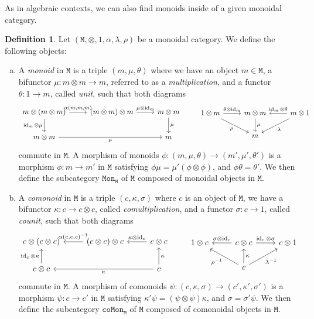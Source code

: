\documentclass[11pt, reqno]{amsart}
\theoremstyle{definition}
\newtheorem{definition}[theorem]{Definition}
\newcommand{\cat}{\texttt}
\newcommand{\catfont}{\texttt}
\newcommand{\Mon}{{\catfont{Mon}}}          %
\newcommand{\coMon}{{\catfont{coMon}}}      %
\DeclareMathOperator{\Id}{id}     %
\begin{document}
As in algebraic contexts, we can also find monoids inside of a given monoidal
category.

\begin{definition}
\label{def:(co)monoids}
Let \((\cat M, \otimes, 1, \alpha, \lambda, \rho)\) be a monoidal category. We
define the following objects:
\begin{enumerate}[(a)]\setlength\itemsep{0em}
\item A \emph{monoid} in \(\cat M\) is a triple \((m, \mu, \theta)\) where we
  have an object \(m \in \cat M\), a bifunctor
  \(\mu: m \otimes m \to m\), referred to as a \emph{multiplication}, and a
  functor \(\theta: 1 \to m\), called \emph{unit}, such that both diagrams
  \[
  \begin{tikzcd}
  m \otimes (m \otimes m) \ar[d, "\Id_m \otimes \mu"']
  \ar[r, "{\alpha(m, m, m)}"]
  &(m \otimes m) \otimes m
  \ar[r, "\mu \otimes \Id_m"]
  &m \otimes m \ar[d, "\mu"] \\
  m \otimes m \ar[rr, "\mu"']
  &&m
  \end{tikzcd}
  \qquad
  \begin{tikzcd}
  1 \otimes m \ar[r, "\theta \otimes \Id_m"]
  \ar[rd, "\rho"']
  & m \otimes m \ar[d, "\mu"]
  &m \otimes 1
  \ar[l, "\Id_m \otimes \theta"']
  \ar[ld, "\lambda"] \\
  &m &
  \end{tikzcd}
  \]
  commute in \(\cat M\). A morphism of monoids
  \(\phi: (m, \mu, \theta) \to (m', \mu', \theta')\) is a morphism
  \(\phi: m \to m'\) in \(\cat M\) satisfying
  \(\phi \mu = \mu'(\phi \otimes \phi)\), and \(\phi \theta = \theta'\). We then
  define the subcategory \(\Mon_{\cat M}\) of \(\cat M\) composed of monoidal
  objects in \(\cat M\).

\item A \emph{comonoid} in \(\cat M\) is a triple \((c, \kappa, \sigma)\) where
  \(c\) is an object of \(\cat M\), we have a bifunctor
  \(\kappa: c \to c \otimes c\), called \emph{comultiplication}, and a functor
  \(\sigma: c \to 1\), called \emph{counit}, such that both diagrams
  \[
  \begin{tikzcd}
  c \otimes (c \otimes c)
  &(c \otimes c) \otimes c
  \ar[l, "{\alpha(c, c, c)^{-1}}"']
  &c \otimes c
  \ar[l, "\kappa \otimes \Id_c"']
  \\
  c \otimes c
  \ar[u, "\Id_c \otimes \kappa"]
  &&c \ar[ll, "\kappa"] \ar[u, "\kappa"']
  \end{tikzcd}
  \qquad
  \begin{tikzcd}
  1 \otimes c
  & c \otimes c
  \ar[l, "\sigma \otimes \Id_c"']
  \ar[r, "\Id_c \otimes \sigma"]
  &c \otimes 1
  \\
  &c \ar[u, "\kappa"'] \ar[lu, "\rho^{-1}"] \ar[ru, "\lambda^{-1}"'] &
  \end{tikzcd}
  \]
  commute in \(\cat M\). A morphism of comonoids
  \(\psi: (c, \kappa, \sigma) \to (c', \kappa', \sigma')\) is a morphism
  \(\psi: c \to c'\) in \(\cat M\) satisfying
  \(\kappa' \psi = (\psi \otimes \psi) \kappa\), and \(\sigma = \sigma'
  \psi\). We then define the subcategory \(\coMon_{\cat M}\) of \(\cat M\)
  composed of comonoidal objects in \(\cat M\).
\end{enumerate}
\end{definition}
\end{document}
